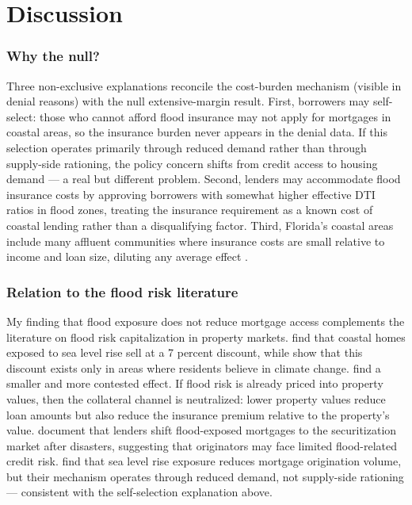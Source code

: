 \documentclass[12pt]{article}
\begin{document}



\section{Discussion}
\label{sec:discussion}

\subsubsection*{Why the null?} Three non-exclusive explanations reconcile the cost-burden mechanism (visible in denial reasons) with the null extensive-margin result. First, borrowers may self-select: those who cannot afford flood insurance may not apply for mortgages in coastal areas, so the insurance burden never appears in the denial data. If this selection operates primarily through reduced demand rather than through supply-side rationing, the policy concern shifts from credit access to housing demand --- a real but different problem. Second, lenders may accommodate flood insurance costs by approving borrowers with somewhat higher effective DTI ratios in flood zones, treating the insurance requirement as a known cost of coastal lending rather than a disqualifying factor. Third, Florida's coastal areas include many affluent communities where insurance costs are small relative to income and loan size, diluting any average effect \citep{gallagher2014learning}.

\subsubsection*{Relation to the flood risk literature} My finding that flood exposure does not reduce mortgage access complements the literature on flood risk capitalization in property markets. \citet{bernstein2019disaster} find that coastal homes exposed to sea level rise sell at a 7 percent discount, while \citet{baldauf2020does} show that this discount exists only in areas where residents believe in climate change. \citet{murfin2020risk} find a smaller and more contested effect. If flood risk is already priced into property values, then the collateral channel is neutralized: lower property values reduce loan amounts but also reduce the insurance premium relative to the property's value. \citet{ouazad2022mortgage} document that lenders shift flood-exposed mortgages to the securitization market after disasters, suggesting that originators may face limited flood-related credit risk. \citet{keys2020neglected} find that sea level rise exposure reduces mortgage origination volume, but their mechanism operates through reduced demand, not supply-side rationing --- consistent with the self-selection explanation above.
\end{document}
